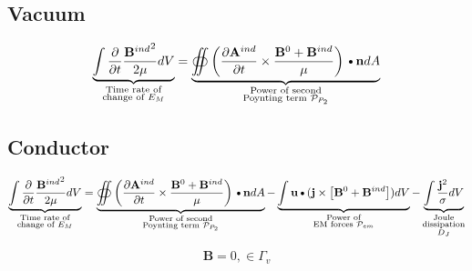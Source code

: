 \documentclass[11pt]{article}
\newcommand{\A}{\mathbf{A}}
\newcommand{\B}{\mathbf{B}}
\newcommand{\PD}{\partial}
\newcommand{\J}{\mathbf{j}}
\newcommand{\N}{\mathbf{n}}
\newcommand{\JSS}{\frac{\mathbf{j}^2}{\sigma}}
\renewcommand{\U}{\mathbf{u}}
\newcommand{\DOT}{\text{\textbullet}}
\begin{document}
\subsection{Vacuum}
\begin{equation}
	\underbrace{\int \frac{\PD }{\PD t} \frac{{\B^{ind}}^2}{2 \mu} dV}_
	{\substack{\text{Time rate of}\\\text{change of $E_M$}}}
	=
	\underbrace{\oiint \left( \frac{\PD \A^{ind}}{\PD t} \times \frac{\B^{0} + \B^{ind}}{\mu} \right)\DOT \N dA }_
	{\substack{\text{Power of second}\\\text{Poynting term $\mathcal P_{P_2}$}}}
\end{equation}
\subsection{Conductor}
\begin{equation}
	\underbrace{\int \frac{\PD }{\PD t} \frac{{\B^{ind}}^2}{2 \mu} dV}_
	{\substack{\text{Time rate of}\\\text{change of $E_M$}}}
	=
	\underbrace{\oiint \left( \frac{\PD \A^{ind}}{\PD t} \times \frac{\B^{0} + \B^{ind}}{\mu} \right)\DOT \N dA }_
	{\substack{\text{Power of second}\\\text{Poynting term $\mathcal P_{P_2}$}}}
	- \underbrace{\int \U \DOT (\J \times \left[ \B^0 + \B^{ind} \right]) dV}_
	{\substack{\text{Power of}\\\text{EM forces $\mathcal P_{em}$}}}
	- \underbrace{\int \JSS dV}_
	{\substack{\text{Joule}\\\text{dissipation}\\\text{$D_J$}}}
\end{equation}

\begin{equation}
	\B = 0, \in \Gamma_v
\end{equation}
\end{document}
